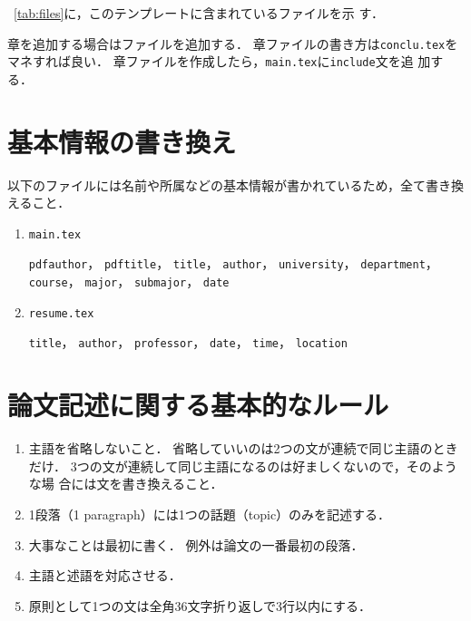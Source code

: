 \tablename~\ref{tab:files}に，このテンプレートに含まれているファイルを示
す．

章を追加する場合はファイルを追加する．
章ファイルの書き方は\texttt{conclu.tex}をマネすれば良い．
章ファイルを作成したら，\texttt{main.tex}に\texttt{\yen include}文を追
加する．

\section{基本情報の書き換え}

以下のファイルには名前や所属などの基本情報が書かれているため，全て書き換
えること．

\begin{enumerate}
 \item \texttt{main.tex}

       \texttt{pdfauthor}，
       \texttt{pdftitle}，
       \texttt{\yen title}，
       \texttt{\yen author}，
       \texttt{\yen university}，
       \texttt{\yen department}，
       \texttt{\yen course}，
       \texttt{\yen major}，
       \texttt{\yen submajor}，
       \texttt{\yen date}
 \item \texttt{resume.tex}

       \texttt{\yen title}，
       \texttt{\yen author}，
       \texttt{\yen professor}，
       \texttt{\yen date}，
       \texttt{\yen time}，
       \texttt{\yen location}
\end{enumerate}

\section{論文記述に関する基本的なルール}

\begin{enumerate}
 \item 主語を省略しないこと．
       省略していいのは2つの文が連続で同じ主語のときだけ．
       3つの文が連続して同じ主語になるのは好ましくないので，そのような場
       合には文を書き換えること．
 \item 1段落（1 paragraph）には1つの話題（topic）のみを記述する．
 \item 大事なことは最初に書く．
       例外は論文の一番最初の段落．
 \item 主語と述語を対応させる．
 \item 原則として1つの文は全角36文字折り返しで3行以内にする．
\end{enumerate}

